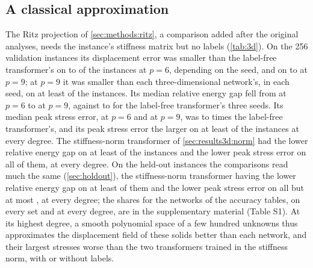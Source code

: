 \subsection{A classical approximation}\label{sec:results3d:ritz}

The Ritz projection of \cref{sec:methods:ritz}, a comparison added after the original
analyses, needs the instance's stiffness matrix but no labels (\cref{tab:3d}). On the 256
validation instances its displacement error was smaller than the label-free transformer's on
\numRitzValFreeDispSixMin{} to \numRitzValFreeDispSixMax{} of the instances at $p=6$,
depending on the seed, and on \numRitzValFreeDispNineMin{} to \numRitzValFreeDispNineMax{}
at $p=9$; at $p=9$ it was smaller than each three-dimensional network's, in each seed, on at
least \numRitzValNineDispAll{} of the instances. Its median relative energy gap fell from
\numRitzValGapSix{} at $p=6$ to \numRitzValGapNine{} at $p=9$, against \numKdFreeMedMin{} to
\numKdFreeMedMax{} for the label-free transformer's three seeds. Its median peak stress
error, \numRitzValPeakSix{} at $p=6$ and \numRitzValPeakNine{} at $p=9$, was
\numRitzValPeakRatioMin{} to \numRitzValPeakRatioMax{} times the label-free transformer's,
and its peak stress error the larger on at least \numRitzValFreePeakMin{} of the instances
at every degree. The stiffness-norm transformer of \cref{sec:results3d:norm} had the lower
relative energy gap on at least \numRitzValKnormGapMin{} of the instances and the lower peak
stress error on all of them, at every degree. On the \numHoldThreeN{} held-out instances the
comparisons read much the same (\cref{sec:holdout}), the stiffness-norm transformer having
the lower relative energy gap on at least \numRitzHoldKnormGapMin{} of them and the lower
peak stress error on all but at most \numRitzHoldKnormPeakMiss{}, at every degree; the
shares for the networks of the accuracy tables, on every set and at every degree, are in the
supplementary material (Table S1). At its highest degree, a smooth polynomial space of a few
hundred unknowns thus approximates the displacement field of these solids better than each
network, and their largest stresses worse than the two transformers trained in the stiffness
norm, with or without labels.
